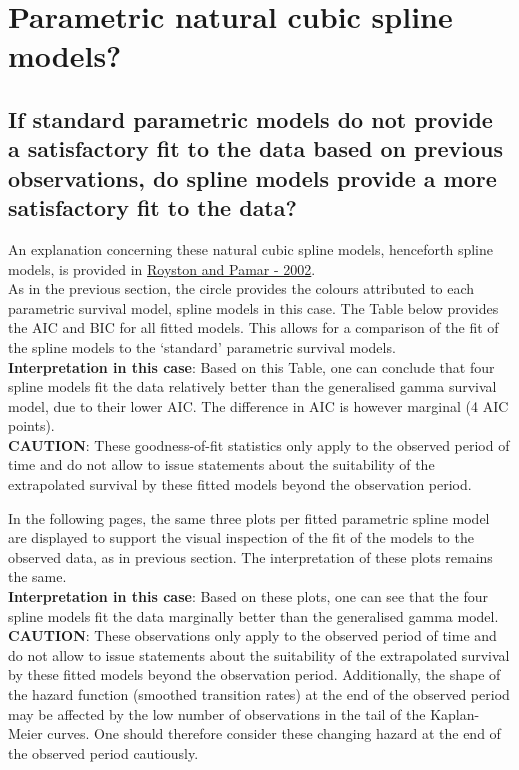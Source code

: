 \documentclass[
]{article}
\begin{document}
\newpage

\hypertarget{parametric-natural-cubic-spline-models}{%
\section{Parametric natural cubic spline
models?}\label{parametric-natural-cubic-spline-models}}

\hypertarget{if-standard-parametric-models-do-not-provide-a-satisfactory-fit-to-the-data-based-on-previous-observations-do-spline-models-provide-a-more-satisfactory-fit-to-the-data}{%
\subsection{If standard parametric models do not provide a satisfactory
fit to the data based on previous observations, do spline models provide
a more satisfactory fit to the
data?}\label{if-standard-parametric-models-do-not-provide-a-satisfactory-fit-to-the-data-based-on-previous-observations-do-spline-models-provide-a-more-satisfactory-fit-to-the-data}}

An explanation concerning these natural cubic spline models, henceforth
spline models, is provided in
\href{https://doi.org/10.1002/sim.1203}{Royston and Pamar - 2002}.\\
As in the previous section, the circle provides the colours attributed
to each parametric survival model, spline models in this case. The Table
below provides the AIC and BIC for all fitted models. This allows for a
comparison of the fit of the spline models to the `standard' parametric
survival models.\\
\textbf{Interpretation in this case}: Based on this Table, one can
conclude that four spline models fit the data relatively better than the
generalised gamma survival model, due to their lower AIC. The difference
in AIC is however marginal (4 AIC points).\\
\textbf{CAUTION}: These goodness-of-fit statistics only apply to the
observed period of time and do not allow to issue statements about the
suitability of the extrapolated survival by these fitted models beyond
the observation period.

In the following pages, the same three plots per fitted parametric
spline model are displayed to support the visual inspection of the fit
of the models to the observed data, as in previous section. The
interpretation of these plots remains the same.\\
\textbf{Interpretation in this case}: Based on these plots, one can see
that the four spline models fit the data marginally better than the
generalised gamma model.\\
\textbf{CAUTION}: These observations only apply to the observed period
of time and do not allow to issue statements about the suitability of
the extrapolated survival by these fitted models beyond the observation
period. Additionally, the shape of the hazard function (smoothed
transition rates) at the end of the observed period may be affected by
the low number of observations in the tail of the Kaplan-Meier curves.
One should therefore consider these changing hazard at the end of the
observed period cautiously.
\end{document}
